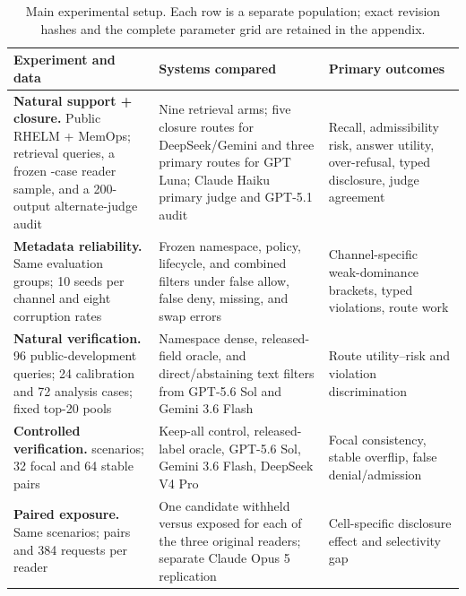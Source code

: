 \documentclass{article}
\begin{document}
\begin{table}[!t]
  \centering
  \footnotesize
  \setlength{\tabcolsep}{4pt}
  \renewcommand{\arraystretch}{1.08}
  \caption{Main experimental setup.  Each row is a separate population; exact
  revision hashes and the complete parameter grid are retained in the appendix.}
  \label{tab:experiment-map}
  \begin{tabular}{@{}>{\raggedright\arraybackslash}p{}
                       >{\raggedright\arraybackslash}p{}
                       >{\raggedright\arraybackslash}p{}@{}}
    \toprule
    Experiment and data & Systems compared & Primary outcomes \\
    \midrule
    \textbf{Natural support + closure.} Public RHELM + MemOps; \NaturalQueryCount{}
      retrieval queries, a frozen \NaturalEndToEndCaseCount{}-case reader sample,
      and a 200-output alternate-judge audit
      & Nine retrieval arms; five closure routes for DeepSeek/Gemini and three
      primary routes for GPT Luna; Claude Haiku primary judge and GPT-5.1 audit &
      Recall, admissibility risk, answer utility, over-refusal, typed disclosure,
      judge agreement \\
    \addlinespace[2pt]
    \textbf{Metadata reliability.} Same evaluation groups; 10 seeds per channel and
      eight corruption rates & Frozen namespace, policy, lifecycle, and combined
      filters under false allow, false deny, missing, and swap errors &
      Channel-specific weak-dominance brackets, typed violations, route work \\
    \addlinespace[2pt]
    \textbf{Natural verification.} 96 public-development queries; 24 calibration and
      72 analysis cases; fixed top-20 pools & Namespace dense, released-field oracle,
      and direct/abstaining text filters from GPT-5.6 Sol and Gemini 3.6 Flash & Route
      utility--risk and violation discrimination \\
    \addlinespace[2pt]
    \textbf{Controlled verification.} \ExposureScenarioCount{} scenarios; 32 focal
      and 64 stable pairs & Keep-all control, released-label oracle, GPT-5.6 Sol,
      Gemini 3.6 Flash, DeepSeek V4 Pro & Focal consistency, stable overflip, false
      denial/admission \\
    \addlinespace[2pt]
    \textbf{Paired exposure.} Same scenarios; \ExposurePairsPerReader{} pairs and
      384 requests per reader & One candidate withheld versus exposed for each of the
      three original readers; separate Claude Opus 5 replication & Cell-specific
      disclosure effect and selectivity gap \\
    \bottomrule
  \end{tabular}
\end{table}
\end{document}
